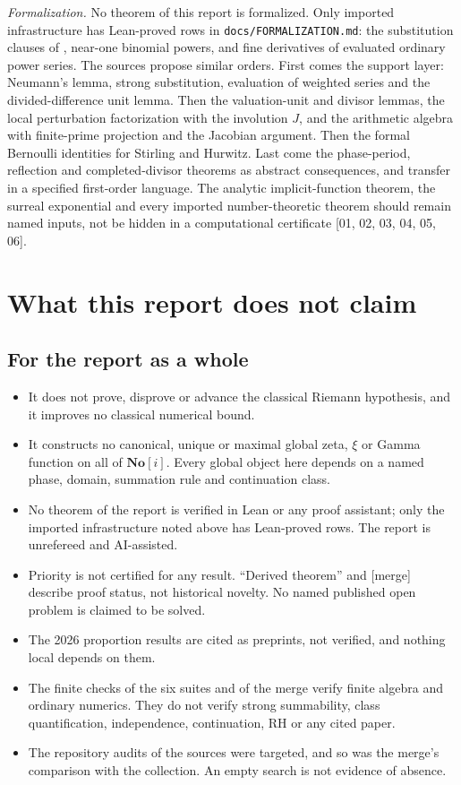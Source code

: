 \documentclass[11pt,a4paper]{article}
\numberwithin{equation}{section}
\theoremstyle{definition}
\theoremstyle{remark}
\newcommand{\No}{\mathbf{No}}
\newcommand{\src}[1]{\textup{[#1]}}
\newcommand{\merge}{\textup{[merge]}}
\begin{document}
\emph{Formalization.} No theorem of this report is formalized. Only imported
infrastructure has Lean-proved rows in \texttt{docs/FORMALIZATION.md}: the
substitution clauses of , near-one binomial powers, and
fine derivatives of evaluated ordinary power series. The sources propose similar
orders. First comes the support layer: Neumann's lemma, strong
substitution, evaluation of weighted series and the divided-difference unit
lemma. Then the valuation-unit and divisor lemmas, the local perturbation
factorization with the involution $J$, and the arithmetic algebra with
finite-prime projection and the Jacobian argument. Then the formal Bernoulli
identities for Stirling and Hurwitz. Last come the phase-period, reflection
and completed-divisor theorems as abstract consequences, and transfer in a
specified first-order language. The analytic implicit-function theorem, the
surreal exponential and every imported number-theoretic theorem should
remain named inputs, not be hidden in a computational certificate
\src{01, 02, 03, 04, 05, 06}.

\section{What this report does not claim}\label{gz:sec:nonclaims}

\subsection{For the report as a whole}
\begin{itemize}
\item It does not prove, disprove or advance the classical Riemann
 hypothesis, and it improves no classical numerical bound.
\item It constructs no canonical, unique or maximal global zeta, $\xi$ or Gamma
 function on all of $\No[i]$. Every global object here depends on a named
 phase, domain, summation rule and continuation class.
\item No theorem of the report is verified in Lean or any proof assistant; only
 the imported infrastructure noted above has Lean-proved rows. The report is
 unrefereed and AI-assisted.
\item Priority is not certified for any result. ``Derived theorem'' and
 \merge{} describe proof status, not historical novelty. No named published
 open problem is claimed to be solved.
\item The 2026 proportion results are cited as preprints, not verified, and
 nothing local depends on them.
\item The finite checks of the six suites and of the merge verify finite
 algebra and ordinary numerics. They do not verify strong summability, class
 quantification, independence, continuation, RH or any cited paper.
\item The repository audits of the sources were targeted, and so was the merge's
 comparison with the collection. An empty search is not evidence of absence.
\end{itemize}
\end{document}
